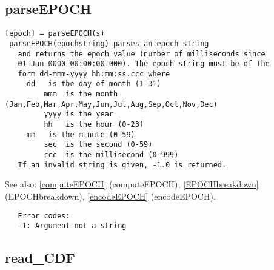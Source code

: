 \documentclass[a4paper]{article}
\begin{document}
\subsection{parseEPOCH\label{parseEPOCH}}

\begin{tscreen}
\begin{verbatim}
[epoch] = parseEPOCH(s)
 parseEPOCH(epochstring) parses an epoch string
   and returns the epoch value (number of milliseconds since
   01-Jan-0000 00:00:00.000). The epoch string must be of the
   form dd-mmm-yyyy hh:mm:ss.ccc where
     dd   is the day of month (1-31)
         mmm  is the month (Jan,Feb,Mar,Apr,May,Jun,Jul,Aug,Sep,Oct,Nov,Dec)
         yyyy is the year
         hh   is the hour (0-23)
     mm   is the minute (0-59)
         sec  is the second (0-59)
         ccc  is the millisecond (0-999)
   If an invalid string is given, -1.0 is returned.
\end{verbatim}

See also: \ref{computeEPOCH} {(computeEPOCH)}, \ref{EPOCHbreakdown} {(EPOCHbreakdown)}, \ref{encodeEPOCH} {(encodeEPOCH)}.
\begin{verbatim}
   Error codes:
   -1: Argument not a string
\end{verbatim}
\end{tscreen}



\subsection{read\_CDF\label{read_CDF}}
\end{document}
